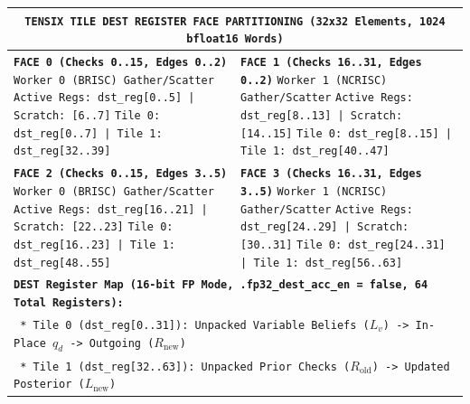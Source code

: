 \documentclass[10pt]{article}
\begin{document}
\begin{center}
\vspace{4pt}
\footnotesize
\setlength{\tabcolsep}{8pt}
\renewcommand{\arraystretch}{1.25}
\begin{tabular}{|p{}|p{}|}
\hline
\multicolumn{2}{|c|}{\cellcolor{gray!15}\textbf{\texttt{TENSIX TILE DEST REGISTER FACE PARTITIONING (32x32 Elements, 1024 bfloat16 Words)}}} \\
\hline
\textbf{\texttt{FACE 0 (Checks 0..15, Edges 0..2)}}\newline
\texttt{Worker 0 (BRISC) Gather/Scatter}\newline
\texttt{Active Regs: dst\_reg[0..5] | Scratch: [6..7]}\newline
\texttt{Tile 0: dst\_reg[0..7]  | Tile 1: dst\_reg[32..39]}
&
\textbf{\texttt{FACE 1 (Checks 16..31, Edges 0..2)}}\newline
\texttt{Worker 1 (NCRISC) Gather/Scatter}\newline
\texttt{Active Regs: dst\_reg[8..13] | Scratch: [14..15]}\newline
\texttt{Tile 0: dst\_reg[8..15] | Tile 1: dst\_reg[40..47]} \\
\hline
\textbf{\texttt{FACE 2 (Checks 0..15, Edges 3..5)}}\newline
\texttt{Worker 0 (BRISC) Gather/Scatter}\newline
\texttt{Active Regs: dst\_reg[16..21] | Scratch: [22..23]}\newline
\texttt{Tile 0: dst\_reg[16..23] | Tile 1: dst\_reg[48..55]}
&
\textbf{\texttt{FACE 3 (Checks 16..31, Edges 3..5)}}\newline
\texttt{Worker 1 (NCRISC) Gather/Scatter}\newline
\texttt{Active Regs: dst\_reg[24..29] | Scratch: [30..31]}\newline
\texttt{Tile 0: dst\_reg[24..31] | Tile 1: dst\_reg[56..63]} \\
\hline
\multicolumn{2}{|l|}{\cellcolor{gray!8}\textbf{\texttt{DEST Register Map (16-bit FP Mode, .fp32\_dest\_acc\_en = false, 64 Total Registers):}}} \\
\multicolumn{2}{|l|}{\cellcolor{gray!8}\texttt{~* Tile 0 (dst\_reg[0..31]): Unpacked Variable Beliefs (}$L_v$\texttt{) -> In-Place }$q_d$\texttt{ -> Outgoing (}$R_{\mathrm{new}}$\texttt{)}} \\
\multicolumn{2}{|l|}{\cellcolor{gray!8}\texttt{~* Tile 1 (dst\_reg[32..63]): Unpacked Prior Checks (}$R_{\mathrm{old}}$\texttt{) -> Updated Posterior (}$L_{\mathrm{new}}$\texttt{)}} \\
\hline
\end{tabular}
\vspace{4pt}
\end{center}
\end{document}

